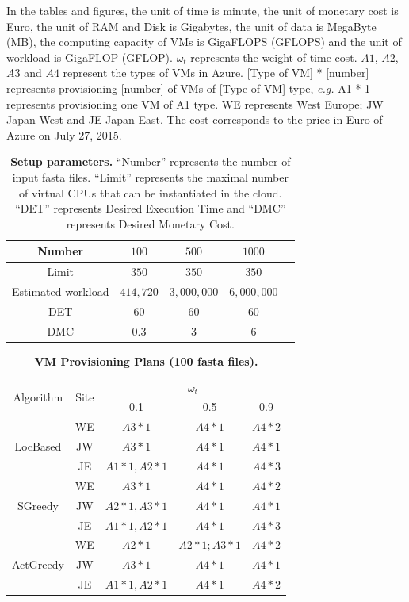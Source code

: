 In the tables and figures, the unit of time is minute, the unit of monetary cost is Euro, the unit of RAM and Disk is Gigabytes, the unit of data is MegaByte (MB), the computing capacity of VMs is GigaFLOPS (GFLOPS) and the unit of workload is GigaFLOP (GFLOP). $\omega_t$ represents the weight of time cost. $A1$, $A2$, $A3$ and $A4$ represent the types of VMs in Azure. [Type of VM] * [number] represents provisioning [number] of VMs of [Type of VM] type, \textit{e.g.} A1 * 1 represents provisioning one VM of A1 type. WE represents West Europe; JW Japan West and JE Japan East. The cost corresponds to the price in Euro of Azure on July 27, 2015.

\begin{table}[htbp]
\caption{\textbf{Setup parameters. } ``Number'' represents the number of input fasta files. ``Limit'' represents the maximal number of virtual CPUs that can be instantiated in the cloud. ``DET'' represents Desired Execution Time and ``DMC'' represents Desired Monetary Cost.}
\label{tab:Set}
\begin{centering}
\captionsetup{justification=centering}
\begin{tabular}{|c|c|c|c|c|}
\hline 
Number & $100$ & $500$ & $1000$ \tabularnewline
\hline 
Limit & $350$ & $350$ & $350$ \tabularnewline
\hline 
Estimated workload & $414,720$ & $3,000,000$ & $6,000,000$\tabularnewline
\hline 
DET & $60$ & $60$ & $60$ \tabularnewline
\hline 
DMC & $0.3$ & $3$ & $6$ \tabularnewline
\hline 
\end{tabular}
\par\end{centering} 
\end{table}

\begin{table}[htbp]
\caption{\textbf{VM Provisioning Plans (100 fasta files). }} 
\label{tab:VMD1}
\begin{centering}
\captionsetup{justification=centering}
\begin{tabular}{|c|c|c|c|c|}
\hline 
\multirow{ 2}{*}{Algorithm} & \multirow{ 2}{*}{Site} & \multicolumn{3}{|c|}{$\omega_t$} \\
\cline{3-5}
& & 0.1 & 0.5 & 0.9 \tabularnewline
\hline 
\multirow{3}{*}{LocBased} & WE & $A3 * 1$ & $A4 * 1$ & $A4 * 2$ \tabularnewline
& JW & $A3 * 1$ & $A4 * 1$ & $A4 * 1$ \tabularnewline
& JE & $A1 * 1, A2 * 1$ & $A4 * 1$ & $A4 * 3$ \tabularnewline
\hline
\multirow{3}{*}{SGreedy} & WE & $A3 * 1$ & $A4 * 1$ & $A4 * 2$ \tabularnewline
& JW & $A2 * 1, A3 * 1$ & $A4 * 1$ & $A4 * 1$ \tabularnewline
& JE & $A1 * 1, A2 * 1$ & $A4 * 1$ & $A4 * 3$ \tabularnewline
\hline 
\multirow{3}{*}{ActGreedy} & WE & $A2 * 1$ & $A2 * 1; A3 * 1$ & $A4 * 2$ \tabularnewline
& JW & $A3 * 1$ & $A4 * 1$ & $A4 * 1$ \tabularnewline
& JE & $A1 * 1, A2 * 1$ & $A4 * 1$ & $A4 * 2$ \tabularnewline
\hline 
\end{tabular}
\par\end{centering} 
\end{table}

